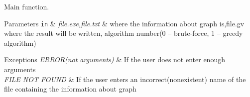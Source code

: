Main function. 


\begin{DoxyParams}[1]{Parameters}
\mbox{\tt in}  & {\em file.\+exe,file.\+txt} & where the information about graph is,file.\+gv where the result will be written, algorithm number(0 -- brute-\/force, 1 -- greedy algorithm) \\
\hline
\end{DoxyParams}

\begin{DoxyExceptions}{Exceptions}
{\em E\+R\+R\+O\+R(not arguments)} & If the user does not enter enough arguments \\
\hline
{\em F\+I\+L\+E N\+O\+T F\+O\+U\+ND} & If the user enters an incorrect(nonexistent) name of the file containing the information about graph \\
\hline
\end{DoxyExceptions}
